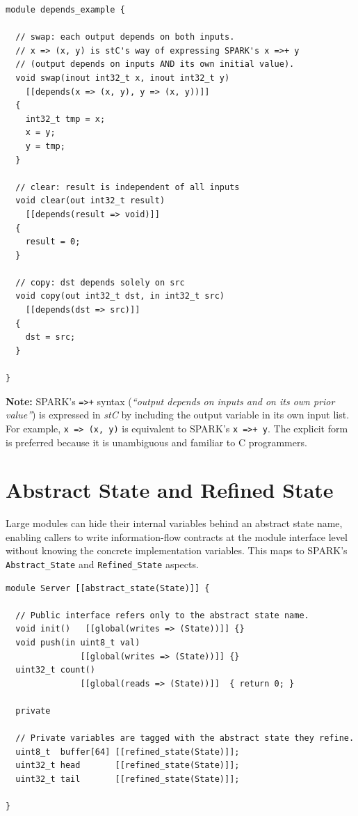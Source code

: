 \documentclass[11pt,letterpaper,twoside,openany]{book}
\begin{document}
\begin{lstlisting}
module depends_example {

  // swap: each output depends on both inputs.
  // x => (x, y) is stC's way of expressing SPARK's x =>+ y
  // (output depends on inputs AND its own initial value).
  void swap(inout int32_t x, inout int32_t y)
    [[depends(x => (x, y), y => (x, y))]]
  {
    int32_t tmp = x;
    x = y;
    y = tmp;
  }

  // clear: result is independent of all inputs
  void clear(out int32_t result)
    [[depends(result => void)]]
  {
    result = 0;
  }

  // copy: dst depends solely on src
  void copy(out int32_t dst, in int32_t src)
    [[depends(dst => src)]]
  {
    dst = src;
  }

}
\end{lstlisting}

\textbf{Note:} SPARK's \verb'=>+' syntax (\emph{``output depends on inputs and on its
own prior value''}) is expressed in \emph{stC} by including the output variable in its
own input list.  For example, \verb'x => (x, y)' is equivalent to SPARK's
\verb'x =>+ y'.  The explicit form is preferred because it is unambiguous and
familiar to C programmers.

\section{Abstract State and Refined State}
Large modules can hide their internal variables behind an abstract state name,
enabling callers to write information-flow contracts at the module interface
level without knowing the concrete implementation variables.  This maps to
SPARK's \verb'Abstract_State' and \verb'Refined_State' aspects.

\begin{lstlisting}
module Server [[abstract_state(State)]] {

  // Public interface refers only to the abstract state name.
  void init()   [[global(writes => (State))]] {}
  void push(in uint8_t val)
               [[global(writes => (State))]] {}
  uint32_t count()
               [[global(reads => (State))]]  { return 0; }

  private

  // Private variables are tagged with the abstract state they refine.
  uint8_t  buffer[64] [[refined_state(State)]];
  uint32_t head       [[refined_state(State)]];
  uint32_t tail       [[refined_state(State)]];

}
\end{lstlisting}
\end{document}
